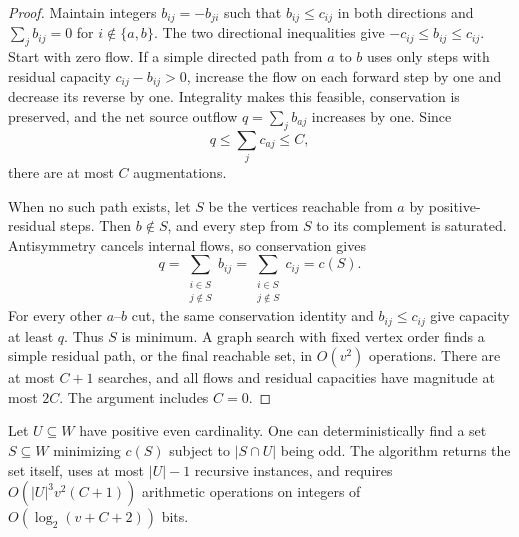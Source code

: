 \begin{proof}
Maintain integers \(b_{ij}=-b_{ji}\) such that
\(b_{ij}\le c_{ij}\) in both directions and
\(\sum_j b_{ij}=0\) for \(i\notin\{a,b\}\).
The two directional inequalities give
\(-c_{ij}\le b_{ij}\le c_{ij}\).
Start with zero flow.  If a simple directed path from \(a\) to \(b\)
uses only steps with residual capacity \(c_{ij}-b_{ij}>0\), increase
the flow on each forward step by one and decrease its reverse by one.
Integrality makes this feasible, conservation is preserved, and the
net source outflow \(q=\sum_j b_{aj}\) increases by one.
Since
\[
 q\le \sum_j c_{aj}\le C,
\]
there are at most \(C\) augmentations.

When no such path exists, let \(S\) be the vertices reachable from \(a\)
by positive-residual steps.  Then \(b\notin S\), and every step from
\(S\) to its complement is saturated.  Antisymmetry cancels internal
flows, so conservation gives
\[
 q=\sum_{\substack{i\in S\\j\notin S}}b_{ij}
   =\sum_{\substack{i\in S\\j\notin S}}c_{ij}=c(S).
\]
For every other \(a\)--\(b\) cut, the same conservation identity and
\(b_{ij}\le c_{ij}\) give capacity at least \(q\).  Thus \(S\) is minimum.
A graph search with fixed vertex order finds a simple residual path,
or the final reachable set, in \(O(v^2)\) operations.  There are at most
\(C+1\) searches, and all flows and residual capacities have magnitude
at most \(2C\).  The argument includes \(C=0\).
\end{proof}

\begin{lemma}
\label{d:lem-odd-cut-oracle}
Let \(U\subseteq W\) have positive even cardinality.  One can
deterministically find a set \(S\subseteq W\) minimizing \(c(S)\)
subject to \(|S\cap U|\) being odd.  The algorithm returns the set itself,
uses at most \(|U|-1\) recursive instances, and requires
\(O(|U|^3v^2(C+1))\) arithmetic operations on integers of
\(O(\log_2(v+C+2))\) bits.
\end{lemma}

